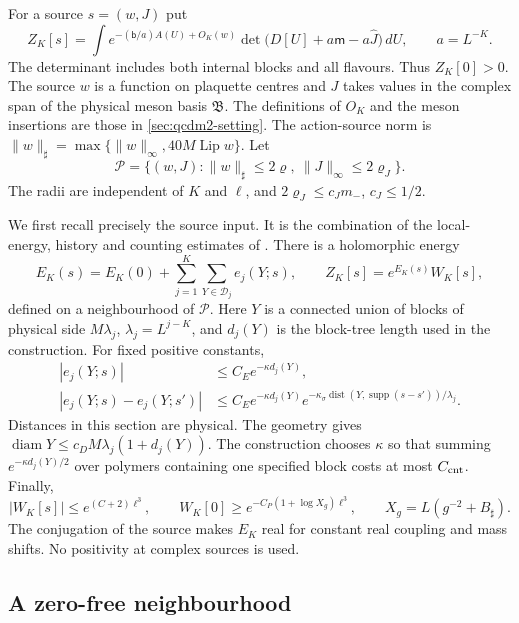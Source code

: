 \documentclass[11pt,letterpaper,reqno]{amsart}
\theoremstyle{definition}
\theoremstyle{remark}
\begin{document}
For a source $s=(w,J)$ put
\[
 Z_K[s]=\int e^{-(\mathsf b/a)A(U)+O_K(w)}
       \det\bigl(D[U]+a\mathsf m-a\widehat J\bigr)\,dU,
 \qquad a=L^{-K}.
\]
The determinant includes both internal blocks and all flavours.
Thus $Z_K[0]>0$. The source $w$ is a function on plaquette
centres and $J$ takes values in the complex span of the physical
meson basis $\mathfrak B$. The definitions of $O_K$ and the meson insertions are
those in \cref{sec:qcdm2-setting}. The action-source norm is
$\|w\|_\sharp=\max\{\|w\|_\infty,40M\operatorname{Lip}w\}$.
Let
\[
 \mathcal P=\{(w,J):\|w\|_\sharp\le2\varrho,
                              \ \|J\|_\infty\le2\varrho_J\}.
\]
The radii are independent of $K$ and $\ell$, and
$2\varrho_J\le c_Jm_-$, $c_J\le1/2$.

We first recall precisely the source input. It is the combination
of the local-energy, history and counting estimates of
\cite[Props. 10.6 and 10.14, and the counting estimate
preceding Prop. 10.16]{QCDM1}.
There is a holomorphic energy
\begin{equation}\label{eq:qcdm2-energy-decomposition}
 E_K(s)=E_K(0)+\sum_{j=1}^K\sum_{Y\in\mathcal D_j}e_j(Y;s),
 \qquad Z_K[s]=e^{E_K(s)}W_K[s],
\end{equation}
defined on a neighbourhood of $\mathcal P$. Here $Y$ is a
connected union of blocks of physical side $M\lambda_j$,
$\lambda_j=L^{j-K}$, and $d_j(Y)$ is the block-tree length
used in the construction. For fixed positive constants,
\begin{align}
 |e_j(Y;s)|&\le C_Ee^{-\kappa d_j(Y)},\label{eq:qcdm2-local-energy}\\
 |e_j(Y;s)-e_j(Y;s')|&\le C_Ee^{-\kappa d_j(Y)}
 e^{-\kappa_\sigma\operatorname{dist}(Y,\operatorname{supp}(s-s'))/\lambda_j}.
 \label{eq:qcdm2-energy-tail}
\end{align}
Distances in this section are physical. The geometry gives
$\operatorname{diam}Y\le c_DM\lambda_j(1+d_j(Y))$.
The construction chooses $\kappa$ so that summing
$e^{-\kappa d_j(Y)/2}$ over polymers containing one specified
block costs at most $C_{\rm cnt}$. Finally,
\begin{equation}\label{eq:qcdm2-partition-window}
 |W_K[s]|\le e^{(C+2)\ell^3},\qquad
 W_K[0]\ge e^{-C_P(1+\log X_g)\ell^3},\qquad
 X_g=L(g^{-2}+B_\sharp).
\end{equation}
The conjugation of the source makes $E_K$ real for constant real
coupling and mass shifts. No positivity at complex sources is
used.

\subsection{A zero-free neighbourhood}
\end{document}
